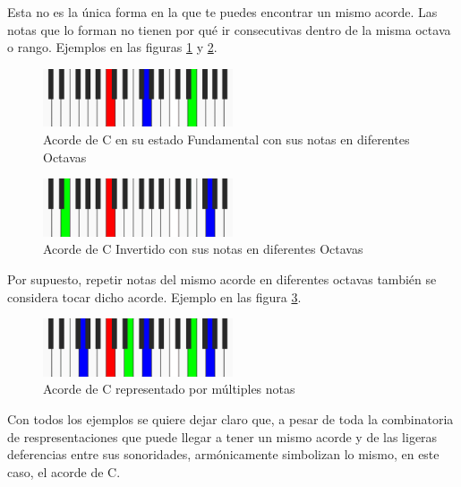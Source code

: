 Esta no es la única forma en la que te puedes encontrar un mismo acorde. Las notas que lo forman no tienen por qué ir consecutivas dentro de la misma octava o rango. Ejemplos en las figuras \ref{fig:inversion_extra1} y \ref{fig:inversion_extra2}. 

\begin{figure}[h]
    \centering
    \includegraphics[width = 0.5\textwidth]{Imagenes/Bitmap/inversion_extra.png}
    \caption{Acorde de C en su estado Fundamental con sus notas en diferentes Octavas}
    \label{fig:inversion_extra1}
\end{figure}

\begin{figure}[h]
    \centering
    \includegraphics[width = 0.5\textwidth]{Imagenes/Bitmap/inversion_extra2.png}
    \caption{Acorde de C Invertido con sus notas en diferentes Octavas}
    \label{fig:inversion_extra2}
\end{figure}

Por supuesto, repetir notas del mismo acorde en diferentes octavas también se considera tocar dicho acorde. Ejemplo en las figura \ref{fig:inversion_extra3}.

\begin{figure}[h]
    \centering
    \includegraphics[width = 0.5\textwidth]{Imagenes/Bitmap/inversion_extra3.png}
    \caption{Acorde de C representado por múltiples notas}
    \label{fig:inversion_extra3}
\end{figure}

Con todos los ejemplos se quiere dejar claro que, a pesar de toda la combinatoria de respresentaciones que puede llegar a tener un mismo acorde y de las ligeras deferencias entre sus sonoridades, armónicamente simbolizan lo mismo, en este caso, el acorde de C.

